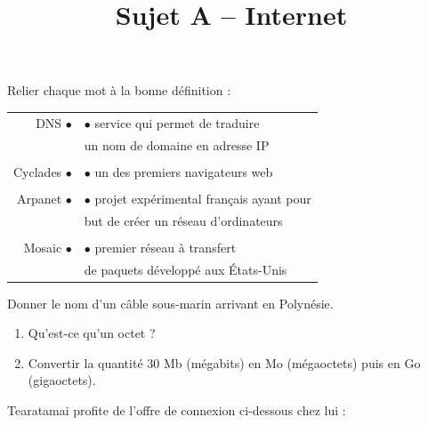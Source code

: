 \documentclass[a4paper]{article}
\begin{document}
\title{Sujet A -- Internet}

\pagestyle{empty}

\date{}
\author{}

\maketitle{}
\thispagestyle{empty}

\exo[1 point] Relier chaque mot à la bonne définition :

\begin{center}
  \begin{tabular}{@{}r@{\hspace{4cm}}l@{}}
    DNS $\bullet$ & $\bullet$ service qui permet de traduire\\
		  & \phantom{$\bullet$} un nom de domaine en adresse IP\\
		  &\\
    Cyclades $\bullet$ & $\bullet$ un des premiers navigateurs web\\
		       &\\
    Arpanet $\bullet$ & $\bullet$ projet expérimental français ayant pour\\
		      & \phantom{$\bullet$} but de créer un réseau d'ordinateurs\\
		      &\\
    Mosaic $\bullet$ & $\bullet$ premier réseau à transfert\\
		     & \phantom{$\bullet$} de paquets développé aux États-Unis\\
  \end{tabular}
\end{center}

\bigskip

\exo[1 point] Donner le nom d'un câble sous-marin arrivant en Polynésie.

\bigskip

\exo[2 points]\vspace*{-2mm}
\begin{enumerate}
  \item Qu'est-ce qu'un octet ?
  \item Convertir la quantité $30$ Mb (mégabits) en Mo (mégaoctets) puis en Go (gigaoctets).
\end{enumerate}

\bigskip

\exo[4 points]\vspace*{-2mm}
Tearatamai profite de l'offre de connexion ci-dessous chez lui :
\end{document}
